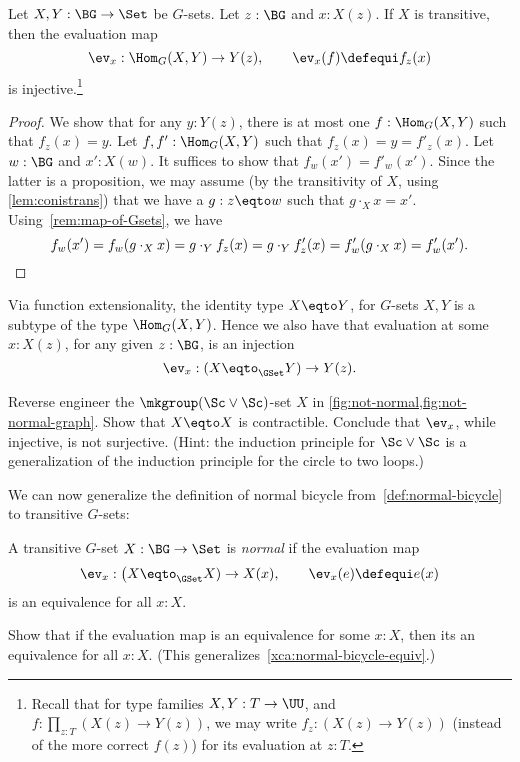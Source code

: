 \begin{lemma}
  \label{lem:evisinjwhentransitive}
  Let $X,Y:\BG\to\Set$ be $G$-sets. Let $z:\BG$ and $x:X(z)$.
  If $X$ is transitive, then the evaluation map
  \[
    \ev_x:\Hom_G(X, Y)\to Y(z),\qquad \ev_x(f)\defequi f_z(x)
  \]
  is injective.\footnote{%
    Recall that for type families $X,Y:T\to\UU$, and
    $f:\prod_{z:T}(X(z)\to Y(z))$, we may write $f_z:(X(z)\to Y(z))$
    (instead of the more correct $f(z)$) for its evaluation at $z:T$.}
\end{lemma}
\begin{proof}
  We show that for any $y:Y(z)$, there is at most one
  $f:\Hom_G(X,Y)$ such that $f_z(x)=y$.
  Let $f,f':\Hom_G(X,Y)$ such that $f_z(x)=y=f'_z(x)$.
  Let $w:\BG$ and  $x':X(w)$. It suffices to show that $f_w(x')=f'_w(x')$.
  Since the latter is a proposition, we may assume (by the transitivity 
  of $X$, using \cref{lem:conistrans}) that we have a $g:z\eqto w$ such 
  that $g\cdot_X x=x'$. Using~\cref{rem:map-of-Gsets}, we have
  \[
    f_w(x')=f_w(g\cdot_X x)=g \cdot_Y f_z(x)=
    g \cdot_Y f'_z(x) = f'_w(g\cdot_X x) = f'_w(x').\qedhere
  \]
\end{proof}

Via function extensionality,
the identity type $X \eqto Y$, for $G$-sets $X,Y$
is a subtype of the type $\Hom_G(X,Y)$.
Hence we also have that evaluation at some $x:X(z)$,
for any given $z:\BG$, is an injection
\[
  \ev_x:(X \eqto_{\GSet} Y)\to Y(z).
\]
\begin{xca}\label{xca:not-normal}
Reverse engineer the $\mkgroup(\Sc\vee\Sc)$-set $X$ in 
\cref{fig:not-normal,fig:not-normal-graph}.
Show that $X\eqto X$ is contractible.
Conclude that $\ev_x$, while injective, is not surjective.
(Hint: the induction principle for $\Sc\vee\Sc$ is a generalization
of the induction principle for the circle to two loops.)
\end{xca}
We can now generalize the definition of normal bicycle
from~\cref{def:normal-bicycle} to
transitive $G$-sets:
\begin{definition}\label{def:normal-action}
  A transitive $G$-set $X : \BG \to \Set$
  is \emph{normal} if the evaluation map
  \[
    \ev_x: \bigl(X \eqto_{\GSet} X) \to X(x),
    \qquad \ev_{x}(e)\defequi e(x)
  \]
  is an equivalence for all $x:X$.
\end{definition}
\begin{xca}\label{xca:normal-action-equiv}
  Show that if the evaluation map is an equivalence for some $x:X$,
  then its an equivalence for all $x:X$.
  (This generalizes~\cref{xca:normal-bicycle-equiv}.)
\end{xca}

